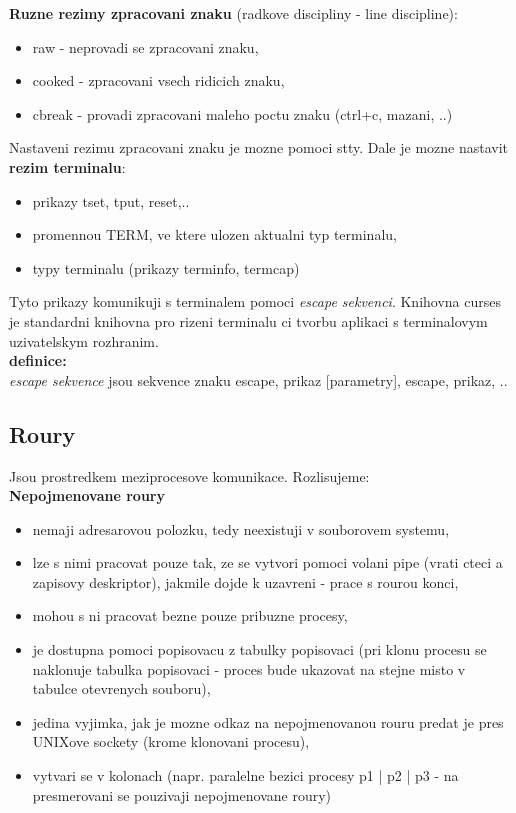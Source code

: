 \documentclass[a4paper, 11pt]{article}
\begin{document}
\textbf{Ruzne rezimy zpracovani znaku} (radkove discipliny - line discipline):
\begin{itemize}
    \item raw - neprovadi se zpracovani znaku,
    \item cooked - zpracovani vsech ridicich znaku,
    \item cbreak - provadi zpracovani maleho poctu znaku (ctrl+c, mazani, ..) \\
\end{itemize}

Nastaveni rezimu zpracovani znaku je mozne pomoci stty. Dale je mozne nastavit \textbf{rezim terminalu}:
\begin{itemize}
    \item prikazy tset, tput, reset,..
    \item promennou TERM, ve ktere ulozen aktualni typ terminalu,
    \item typy terminalu (prikazy terminfo, termcap) \\
\end{itemize}

Tyto prikazy komunikuji s terminalem pomoci \textit{escape sekvenci}. Knihovna curses je standardni knihovna pro rizeni terminalu ci tvorbu aplikaci s terminalovym uzivatelskym rozhranim. \\

\textbf{definice:} \\[0.5em]
\textit{escape sekvence} jsou sekvence znaku escape, prikaz [parametry], escape, prikaz, .. \\

\newpage

\subsection{Roury}
Jsou prostredkem meziprocesove komunikace. Rozlisujeme: \\

\textbf{Nepojmenovane roury}
\begin{itemize}
    \item nemaji adresarovou polozku, tedy neexistuji v souborovem systemu,
    \item lze s nimi pracovat pouze tak, ze se vytvori pomoci volani pipe (vrati cteci a zapisovy deskriptor), jakmile dojde k uzavreni - prace s rourou konci,
    \item mohou s ni pracovat bezne pouze pribuzne procesy,
    \item je dostupna pomoci popisovacu z tabulky popisovaci (pri klonu procesu se naklonuje tabulka popisovaci - proces bude ukazovat na stejne misto v tabulce otevrenych souboru),
    \item jedina vyjimka, jak je mozne odkaz na nepojmenovanou rouru predat je pres UNIXove sockety (krome klonovani procesu),
    \item vytvari se v kolonach (napr. paralelne bezici procesy p1 | p2 | p3 - na presmerovani se pouzivaji nepojmenovane roury) \\
\end{itemize}
\end{document}
